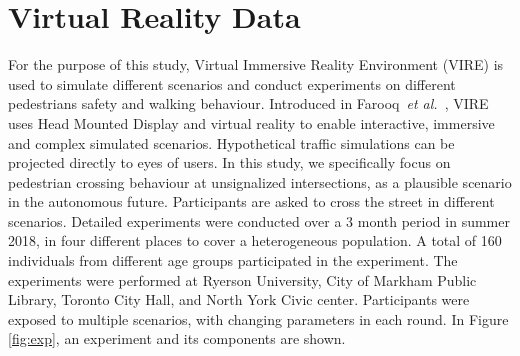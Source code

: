 \section{Virtual Reality Data}
\label{S:T3}
For the purpose of this study, Virtual Immersive Reality Environment (VIRE) is used to simulate different scenarios and conduct experiments on different pedestrians safety and walking behaviour. Introduced in Farooq~\textit{et al.}~\citep{farooqvire}, VIRE uses Head Mounted Display and virtual reality to enable interactive, immersive and complex simulated scenarios. Hypothetical traffic simulations can be projected directly to eyes of users. In this study, we specifically focus on pedestrian crossing behaviour at unsignalized intersections, as a plausible scenario in the autonomous future. Participants are asked to cross the street in different scenarios.
Detailed experiments were conducted over a 3 month period in summer 2018, in four different places to cover a heterogeneous population. A total of 160 individuals from different age groups participated in the experiment. The experiments were performed at Ryerson University, City of Markham Public Library, Toronto City Hall, and North York Civic center. Participants were exposed to multiple scenarios, with changing parameters in each round. In Figure \ref{fig:exp}, an experiment and its components are shown.
